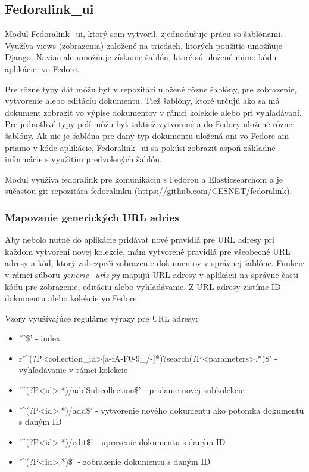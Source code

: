 \documentclass[thesis=M,slovak]{FITthesis}[2013/05/06]
\begin{document}
\subsection{Fedoralink\_ui}
Modul Fedoralink\_ui, ktorý som vytvoril, zjednodušuje prácu so šablónami. Využíva views (zobrazenia) založené na triedach, ktorých použitie umožňuje Django. Naviac ale umožňuje získanie šablón, ktoré sú uložené mimo kódu aplikácie, vo Fedore. 

Pre rôzne typy dát môžu byť v repozitári uložené rôzne šablóny, pre zobrazenie, vytvorenie alebo editáciu dokumentu. Tiež šablóny, ktoré určujú ako sa má dokument zobraziť vo výpise dokumentov v rámci kolekcie alebo pri vyhľadávaní. Pre jednotlivé typy polí môžu byť taktiež vytvorené a do Fedory uložené rôzne šablóny. Ak nie je šablóna pre daný typ dokumentu uložená ani vo Fedore ani priamo v kóde aplikácie, Fedoralink\_ui sa pokúsi zobraziť aspoň základné informácie s využitím predvolených šablón. 

Modul využíva fedoralink pre komunikáciu s Fedorou a Elasticsearchom a je súčasťou git repozitára fedoralinku (\url{https://github.com/CESNET/fedoralink}).

\subsubsection{Mapovanie generických URL adries}
Aby nebolo nutné do aplikácie pridávať nové pravidlá pre URL adresy pri každom vytvorení novej kolekcie, mám vytvorené pravidlá pre všeobecné URL adresy a kód, ktorý zabezpečí zobrazenie dokumentov v správnej šablóne.
Funkcie v rámci súboru {\em generic\_urls.py} mapujú URL adresy v aplikácii na správne časti kódu pre zobrazenie, editáciu alebo vyhľadávanie. Z URL adresy zistíme ID dokumentu alebo kolekcie vo Fedore.

Vzory využívajúce regulárne výrazy pre URL adresy:
\begin{itemize}
	\item '\textasciicircum\$' - index
	\item r'\textasciicircum(?P<collection\_id>[a-fA-F0-9\_/-]*)?search(?P<parameters>.*)\$' - vyhľadávanie v rámci kolekcie
	\item '\textasciicircum(?P<id>.*)/addSubcollection\$' - pridanie novej subkolekcie
	\item '\textasciicircum(?P<id>.*)/add\$' - vytvorenie nového dokumentu ako potomka dokumentu s daným ID
	\item '\textasciicircum(?P<id>.*)/edit\$' - upravenie dokumentu s daným ID
	\item '\textasciicircum(?P<id>.*)\$' - zobrazenie dokumentu s daným ID
\end{itemize}
\end{document}
